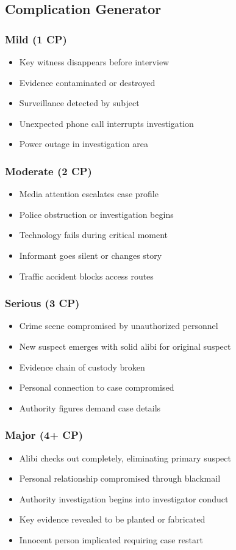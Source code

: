 \documentclass[11pt]{article}
\begin{document}
\subsection{Complication Generator}

\subsubsection{Mild (1 CP)}
\begin{itemize}
\item Key witness disappears before interview
\item Evidence contaminated or destroyed
\item Surveillance detected by subject
\item Unexpected phone call interrupts investigation
\item Power outage in investigation area
\end{itemize}

\subsubsection{Moderate (2 CP)}
\begin{itemize}
\item Media attention escalates case profile
\item Police obstruction or investigation begins
\item Technology fails during critical moment
\item Informant goes silent or changes story
\item Traffic accident blocks access routes
\end{itemize}

\subsubsection{Serious (3 CP)}
\begin{itemize}
\item Crime scene compromised by unauthorized personnel
\item New suspect emerges with solid alibi for original suspect
\item Evidence chain of custody broken
\item Personal connection to case compromised
\item Authority figures demand case details
\end{itemize}

\subsubsection{Major (4+ CP)}
\begin{itemize}
\item Alibi checks out completely, eliminating primary suspect
\item Personal relationship compromised through blackmail
\item Authority investigation begins into investigator conduct
\item Key evidence revealed to be planted or fabricated
\item Innocent person implicated requiring case restart
\end{itemize}
\end{document}
